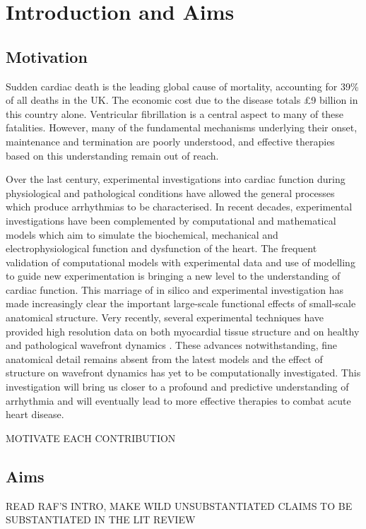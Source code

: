 \chapter{Introduction and Aims}
\dblspace

\section{Motivation}
\label{sec:intro:motivation}
  Sudden cardiac death is the leading global cause of mortality, accounting for 39\% of all deaths in the UK. The economic cost due to the disease totals \pounds9 billion in this country alone. Ventricular fibrillation is a central aspect to many of these fatalities. However, many of the fundamental mechanisms underlying their onset, maintenance and termination are poorly understood, and effective therapies based on this understanding remain out of reach.
  
  Over the last century, experimental investigations into cardiac function during physiological and pathological conditions have allowed the general processes which produce arrhythmias to be characterised. In recent decades, experimental investigations have been complemented by computational and mathematical models which aim to simulate the biochemical, mechanical and electrophysiological function and dysfunction of the heart. The frequent validation of computational models with experimental data and use of modelling to guide new experimentation is bringing a new level to the understanding of cardiac function. This marriage of in silico and experimental investigation has made increasingly clear the important large-scale functional effects of small-scale anatomical structure. Very recently, several experimental techniques have provided high resolution data on both myocardial tissue structure and on healthy and pathological wavefront dynamics \cite{Burton2006,Plank2009,Bishop2010}. These advances notwithstanding, fine anatomical detail remains absent from the latest models and the effect of structure on wavefront dynamics has yet to be computationally investigated. This investigation will bring us closer to a profound and predictive understanding of arrhythmia and will eventually lead to more effective therapies to combat acute heart disease.
  
  MOTIVATE EACH CONTRIBUTION

\section{Aims}
READ RAF'S INTRO, MAKE WILD UNSUBSTANTIATED CLAIMS TO BE SUBSTANTIATED IN THE LIT REVIEW

